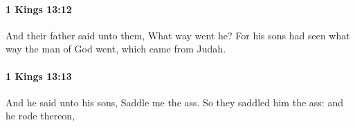 		\paragraph{1 Kings 13:12} %
			\label{1KINGS-13-12}

			And their father said unto them, What way went he? For his sons had seen what way the man of God went, which came from Judah.


		\paragraph{1 Kings 13:13} %
			\label{1KINGS-13-13}

			And he said unto his sons, Saddle me the ass. So they saddled him the ass: and he rode thereon,


